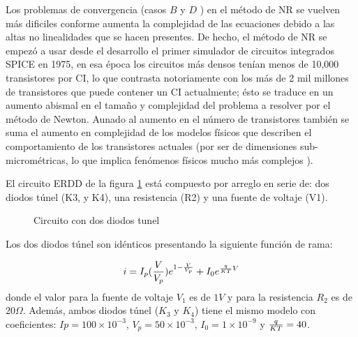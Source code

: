\documentclass[conference,letterpaper,onecolumn]{IEEEtran}
\begin{document}
Los problemas de convergencia (casos $B$ y $D$ ) en el m\'etodo de NR se vuelven m\'as dificiles conforme aumenta la complejidad de las ecuaciones debido a las altas no linealidades que se hacen presentes. De hecho, el m\'etodo de NR se empez\'o a usar desde el desarrollo el primer simulador de circuitos integrados SPICE \cite{homo_hspice} en 1975, en esa \'epoca los circuitos m\'as densos ten{\'i}an menos de 10,000 transistores por CI, lo que contrasta notoriamente con los  m\'as de 2 mil millones de transistores \cite{lmoore} que puede contener un CI actualmente; \'esto se traduce en un aumento abismal en el tama\~no y complejidad del problema a resolver por el m\'etodo de Newton. Aunado al aumento en el n\'umero de transistores tambi\'en se suma el aumento en complejidad de los modelos f{\'i}sicos que describen el comportamiento de los transistores actuales (por ser de dimensiones sub-microm\'etricas, lo que implica fen\'omenos f{\'i}sicos mucho m\'as complejos \cite{homo_BSIM}).  

El circuito ERDD de la figura \ref{2tunelx} est\'a compuesto  por arreglo en serie de: dos diodos t\'unel (K3, y K4), una resistencia (R2) y una fuente de voltaje (V1). 
\begin{figure}[hbtp]
\centerline{
\epsfxsize=70mm 
}
\caption{Circuito con dos diodos tunel}
\label{2tunelx}  
\end{figure}



Los dos diodos t\'unel son id\'enticos presentando la siguiente funci\'on de rama:

\begin{displaymath}
i=I_p({V \over V_p})e^{1-{V \over V_p}}+I_0e^{{q \over {KT}} V}
\end{displaymath}
donde el valor para la fuente de voltaje $V_1$ es de $1V$ y para la resistencia  $R_2$ es de $20\Omega$. Adem\'as, ambos diodos t\'unel ($K_3$ y $K_4$) tiene el mismo
modelo con coeficientes:
$Ip=100 \times 10^{-3}$,
$V_p=50 \times 10^{-3} $, $I_0=1\times 10^{-9}$ y ${q \over {KT}} = 40$. 
\end{document}
